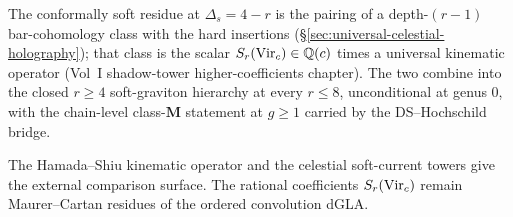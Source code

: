 The conformally soft residue at $\Delta_s = 4 - r$ is the pairing of a
depth-$(r-1)$ bar-cohomology class with the hard insertions
(\S\ref{sec:universal-celestial-holography}); that class is the scalar
$S_r(\mathrm{Vir}_c) \in \mathbb Q(c)$ times a universal kinematic operator (Vol~I
shadow-tower higher-coefficients chapter). The two combine into the
closed $r \geq 4$ soft-graviton hierarchy at every $r \leq 8$,
unconditional at genus $0$, with the chain-level class-$\mathbf M$
statement at $g \geq 1$ carried by the DS--Hochschild bridge.

The Hamada--Shiu kinematic operator and the celestial soft-current
towers give the external comparison surface.  The rational
coefficients \(S_r(\mathrm{Vir}_c)\) remain Maurer--Cartan residues of the
ordered convolution dGLA.

